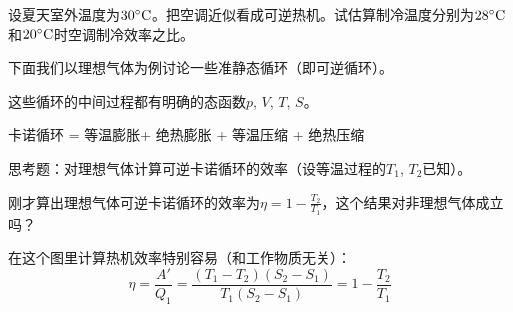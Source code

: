\documentclass[CJK]{beamer}
\begin{document}
\begin{frame}
\bch
设夏天室外温度为$30^\circ \mathrm{C}$。把空调近似看成可逆热机。试估算制冷温度分别为$28^\circ \mathrm{C}$和$20^\circ \mathrm{C}$时空调制冷效率之比。
\ech
\end{frame}

\begin{frame}
\bch
下面我们以理想气体为例讨论一些准静态循环（即可逆循环）。

\skipline

这些循环的中间过程都有明确的态函数$p$, $V$, $T$, $S$。
\ech
\end{frame}

\begin{frame}
\bch
{}
\ech
\end{frame}

\begin{frame}
\bch
{}
\ech
\end{frame}


\begin{frame}
\bch
{}
\ech
\end{frame}

\begin{frame}
\bch
{}
\ech
\end{frame}


\begin{frame}
\bch
卡诺循环 = 等温膨胀+ 绝热膨胀 + 等温压缩 + 绝热压缩
\ech
\end{frame}

\begin{frame}
\bch
{}

思考题：对理想气体计算可逆卡诺循环的效率（设等温过程的$T_1$, $T_2$已知）。
\ech
\end{frame}


\begin{frame}
\bch
刚才算出理想气体可逆卡诺循环的效率为$\eta = 1-\frac{T_2}{T_1}$，这个结果对非理想气体成立吗？
\ech
\end{frame}

\begin{frame}
\bch
{}

在这个图里计算热机效率特别容易（和工作物质无关）：
$$\eta = \frac{A'}{Q_1} = \frac{(T_1-T_2)(S_2-S_1)}{T_1(S_2-S_1)} = 1- \frac{T_2}{T_1}$$

\ech
\end{frame}
\end{document}
